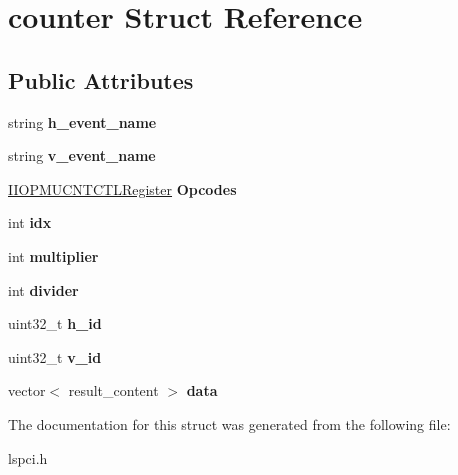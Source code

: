 \hypertarget{structcounter}{}\section{counter Struct Reference}
\label{structcounter}
\subsection*{Public Attributes}
\begin{DoxyCompactItemize}
\item 
\mbox{\label{structcounter_addb64347e960e0b7535b4992bec1f522}} 
string {\bfseries h\+\_\+event\+\_\+name}
\item 
\mbox{\label{structcounter_add48f1203e73fd7c50564babbe8b6176}} 
string {\bfseries v\+\_\+event\+\_\+name}
\item 
\mbox{\label{structcounter_a63457f99b045b0811071b9584557238f}} 
\mbox{\hyperlink{struct_i_i_o_p_m_u_c_n_t_c_t_l_register}{I\+I\+O\+P\+M\+U\+C\+N\+T\+C\+T\+L\+Register}} {\bfseries Opcodes}
\item 
\mbox{\label{structcounter_aa6611db7a280c8bb6bf4e19506bc6a02}} 
int {\bfseries idx}
\item 
\mbox{\label{structcounter_ac3b51026bf7769fe85471d2f7f914c49}} 
int {\bfseries multiplier}
\item 
\mbox{\label{structcounter_a97ec3319c8309f41de78490a46cb5e55}} 
int {\bfseries divider}
\item 
\mbox{\label{structcounter_ac4cc48aebe0bd4cdc697b9023f41ab0e}} 
uint32\+\_\+t {\bfseries h\+\_\+id}
\item 
\mbox{\label{structcounter_a5c5c189e06e1164376c56b639b061f11}} 
uint32\+\_\+t {\bfseries v\+\_\+id}
\item 
\mbox{\label{structcounter_a39cdc8ce37a5cc283eab5a362adc7f46}} 
vector$<$ result\+\_\+content $>$ {\bfseries data}
\end{DoxyCompactItemize}


The documentation for this struct was generated from the following file\+:\begin{DoxyCompactItemize}
\item 
lspci.\+h\end{DoxyCompactItemize}
